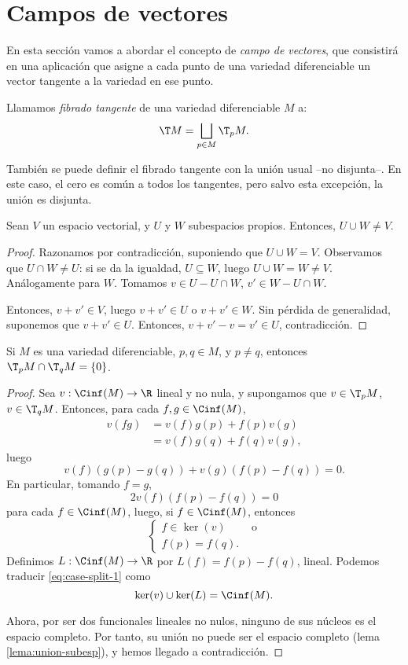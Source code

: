 \section{Campos de vectores}

En esta sección vamos a abordar el concepto de \emph{campo de vectores}, que
consistirá en una aplicación que asigne a cada punto de una variedad
diferenciable un vector tangente a la variedad en ese punto.
\begin{ndef}
  Llamamos \emph{fibrado tangente} de una variedad diferenciable $M$ a:
  \[
    \T M = \bigsqcup_{p\in M} \T_{p}M
  .\]
\end{ndef}

También se puede definir el fibrado tangente con la unión usual --no
disjunta--. En este caso, el cero es común a todos los tangentes, pero salvo
esta excepción, la unión es disjunta.
\begin{lema} \label{lema:union-subesp}
  Sean $V$ un espacio vectorial, y $U$ y $W$ subespacios propios. Entonces,
  $U\cup W\ne V$.
\end{lema}
\begin{proof}
  Razonamos por contradicción, suponiendo que $U\cup W = V$. Observamos que
  $U\cap W \ne U$: si se da la igualdad, $U\subseteq W$, luego $U\cup W = W \ne
  V$. Análogamente para $W$. Tomamos $v\in U -U\cap W$, $v'\in W - U\cap W$.

  Entonces, $v+v'\in V$, luego $v+v'\in U$ o $v+v'\in W$. Sin pérdida de
  generalidad, suponemos que $v+v'\in U$. Entonces, $v+v'-v = v'\in U$,
  contradicción.
\end{proof}
\begin{nprop}
  Si $M$ es una variedad diferenciable, $p,q\in M$, y $p\ne q$, entonces
  $\T_{p}M \cap \T_{q}M = \{0\}$.
\end{nprop}
\begin{proof}
  Sea $v: \Cinf(M)\to\R$ lineal y no nula, y supongamos que $v\in \T_{p}M$,
  $v\in \T_{q}M$. Entonces, para cada $f,g\in\Cinf(M)$,
  \begin{align*}
    v(fg) & = v(f)g(p) + f(p)v(g) \\
    & = v(f)g(q) + f(q)v(g),
  \end{align*}
  luego
  \[
    v(f)(g(p)-g(q)) + v(g)(f(p)-f(q)) = 0
    .\]
  En particular, tomando $f=g$,
  \[
    2v(f)(f(p)-f(q)) = 0
  \]
  para cada $f\in\Cinf(M)$, luego, si $f\in\Cinf(M)$, entonces
  \begin{equation}
    \label{eq:case-split-1}
    \tag{$*$}
    \begin{cases}
      f\in\ker(v) & \text{ o} \\
      f(p) = f(q).
    \end{cases}
  \end{equation}
  Definimos $L:\Cinf(M)\to\R$ por $L(f) = f(p)-f(q)$, lineal. Podemos traducir
  \eqref{eq:case-split-1} como
  \[
    \ker(v)\cup\ker(L) = \Cinf(M)
    .\]
  
  Ahora, por ser dos funcionales lineales no nulos, ninguno de sus núcleos es el
  espacio completo. Por tanto, su unión no puede ser el espacio completo (lema
  \ref{lema:union-subesp}), y hemos llegado a contradicción.
\end{proof}

